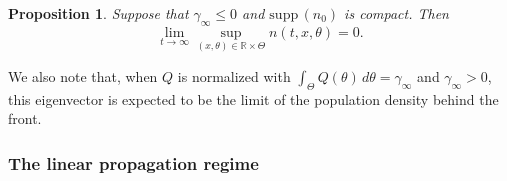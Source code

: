 \documentclass[11pt]{article}    %
\newtheorem{prop}[theorem]{Proposition}
\newcommand{\R}{\mathbb{R}}
\newcommand{\supp}{\mathrm{supp}\,}
\begin{document}
\begin{prop}\label{prop:extinction}
Suppose that $\gamma_\infty \leq 0$ and $\supp(n_0)$ is compact.  Then
\begin{equation*}
\lim_{t \to \infty} \sup_{(x,\theta)\in\R\times \Theta} n(t,x,\theta) = 0.
\end{equation*}
\end{prop}


We also note that, when $Q$ is normalized with $\int_{\Theta} Q(\theta) \, d\theta = \gamma_\infty$ and $\gamma_\infty > 0$, this eigenvector is expected to be the limit of the population density behind the front. 



\subsubsection*{The linear propagation regime}
\end{document}
